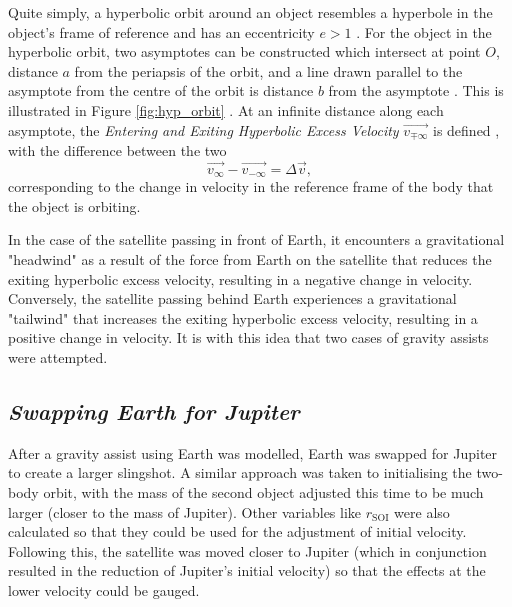 \documentclass[11pt, english]{report}
\begin{document}
{Quite simply, a hyperbolic orbit around an object resembles a hyperbole in the object's frame of reference and has an eccentricity $e > 1$ \cite{kluever_spaceflight_2003}. For the object in the hyperbolic orbit, two asymptotes can be constructed which intersect at point $O$, distance $a$ from the periapsis of the orbit, and a line drawn parallel to the asymptote from the centre of the orbit is distance $b$ from the asymptote . This is illustrated in Figure \ref{fig:hyp_orbit} . At an infinite distance along each asymptote, the \emph{Entering and Exiting Hyperbolic Excess Velocity} $\vec{v_{\mp \infty}}$ is defined , with the difference between the two
\begin{equation} 
    \vec{v_{\infty}} - \vec{v_{-\infty}} = \Delta \vec{v},
\end{equation}
corresponding to the change in velocity in the reference frame of the body that the object is orbiting.
}

In the case of the satellite passing in front of Earth, it encounters a gravitational "headwind" as a result of the force from Earth on the satellite that reduces the exiting hyperbolic excess velocity, resulting in a negative change in velocity. Conversely, the satellite passing behind Earth experiences a gravitational "tailwind" that increases the exiting hyperbolic excess velocity, resulting in a positive change in velocity. It is with this idea that two cases of gravity assists were attempted.

\subsection{\textsl{Swapping Earth for Jupiter}}
\normalsize{\noindent After a gravity assist using Earth was modelled, Earth was swapped for Jupiter to create a larger slingshot. A similar approach was taken to initialising the two-body orbit, with the mass of the second object adjusted this time to be much larger (closer to the mass of Jupiter). Other variables like $r_\mathrm{{SOI}}$ were also calculated so that they could be used for the adjustment of initial velocity.
Following this, the satellite was moved closer to Jupiter (which in conjunction resulted in the reduction of Jupiter's initial velocity) so that the effects at the lower velocity could be gauged.
}
\end{document}
